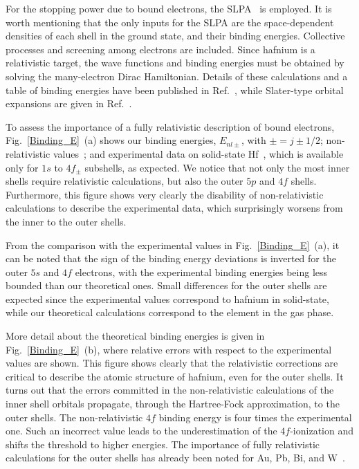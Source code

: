 For the stopping power due to bound electrons, the SLPA~\cite{mon17,mon13} 
is employed. It is worth mentioning that the only inputs for the SLPA 
are the space-dependent densities of each shell in the ground state, 
and their binding energies. Collective processes and screening among 
electrons are included. Since hafnium is a relativistic target, the wave 
functions and binding energies must be obtained by solving the many-electron 
Dirac Hamiltonian. Details of these calculations and a table of binding 
energies have been published in Ref.~\cite{mendez2019}, while Slater-type 
orbital expansions are given in Ref.~\cite{Hf_arxiv}.

To assess the importance of a fully relativistic description of bound 
electrons, Fig.~\ref{Binding_E}~(a) shows our binding energies, 
$E_{nl\pm}$, with $\pm=j\pm1/2$; non-relativistic values~\cite{badnell97}; 
and experimental data on solid-state Hf~\cite{williams1995}, which is 
available only for $1s$ to $4f_{\pm}$ subshells, as expected. We notice that not only the most inner shells 
require relativistic calculations, but also the outer $5p$ and $4f$ 
shells. Furthermore, this figure shows very clearly the disability of 
non-relativistic calculations to describe the experimental data, which 
surprisingly worsens from the inner to the outer shells.

From the comparison with the experimental values in Fig.~\ref{Binding_E}~(a),
it can be noted that the sign of the binding energy deviations is 
inverted for the outer $5s$ and $4f$ electrons, with the experimental 
binding energies being less bounded than our theoretical ones. Small 
differences for the outer shells are expected since the experimental
values correspond to hafnium in solid-state, while our theoretical 
calculations correspond to the element in the gas phase.

More detail about the theoretical binding energies is given in 
Fig.~\ref{Binding_E}~(b), where relative errors with respect to the 
experimental values are shown. This figure shows clearly that the 
relativistic corrections are critical to describe the atomic structure 
of hafnium, even for the outer shells. It turns out that the errors 
committed in the non-relativistic calculations of the inner shell 
orbitals propagate, through the Hartree-Fock approximation, to the outer 
shells. 
The non-relativistic $4f$ binding energy is four times the experimental one. Such an incorrect value leads to the underestimation of the $4f$-ionization and shifts  the threshold to higher energies.  
The importance of fully relativistic calculations for the outer 
shells has already been noted for Au, Pb, Bi, and W~\cite{mon09}.

